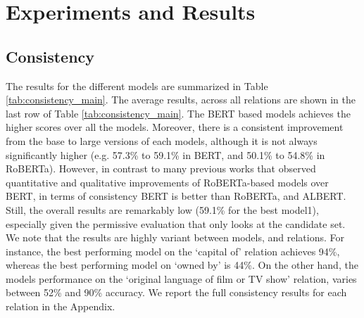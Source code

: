 \section{Experiments and Results}
\label{sec:experiments}




\subsection{Consistency}

The results for the different models are summarized in Table \ref{tab:consistency_main}.
The average results, across all relations are shown in the last row of Table \ref{tab:consistency_main}. The BERT based models achieves the higher scores over all the models. Moreover, there is a consistent improvement from the base to large versions of each models, although it is not always significantly higher (e.g. 57.3\% to 59.1\% in BERT, and 50.1\% to 54.8\% in RoBERTa).
However, in contrast to many previous works that observed quantitative and qualitative improvements of RoBERTa-based models over BERT, in terms of consistency BERT is better than RoBERTa, and ALBERT.
Still, the overall results are remarkably low (59.1\% for the best model1), especially given the permissive evaluation that only looks at the candidate set.
We note that the results are highly variant between models, and relations. For instance, the best performing model on the `capital of' relation achieves 94\%, whereas the best performing model on `owned by' is 44\%. 
On the other hand, the models performance on the `original language of film or TV show' relation, varies between 52\% and 90\% accuracy.
We report the full consistency results for each relation in the Appendix.



